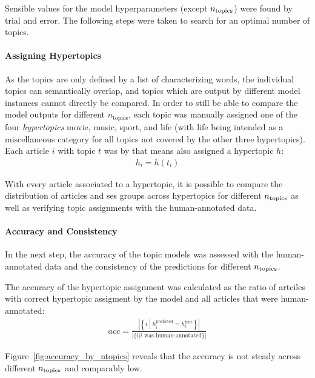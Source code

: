 Sensible values for the model hyperparameters (except $n_\text{topics}$) were found by trial and error. The following steps were taken to search for an optimal number of topics.

\paragraph{Assigning Hypertopics}
As the topics are only defined by a list of characterizing words, the individual topics can semantically overlap, and topics which are output by different model instances cannot directly be compared. In order to still be able to compare the model outputs for different $n_\text{topics}$, each topic was manually assigned one of the four \textit{hypertopics} movie, music, sport, and life (with life being intended as a miscellaneous category for all topics not covered by the other three hypertopics). Each article $i$ with topic $t$ was by that means also assigned a hypertopic $h$:
\begin{align}
    h_i = h(t_i)
\end{align}

With every article associated to a hypertopic, it is possible to compare the distribution of articles and \gls{ses} groups across hypertopics for different $n_\text{topics}$ as well as verifying topic assignments with the human-annotated data.

\paragraph{Accuracy and Consistency}
In the next step, the accuracy of the topic models was assessed with the human-annotated data and the consistency of the predictions for different $n_\text{topics}$.

The accuracy of the hypertopic assignment was calculated as the ratio of artciles with correct hypertopic assigment by the model and all articles that were human-annotated:
\begin{align}
    acc = \frac{
        \left|
            \left\{i\middle|h_{i}^\text{predicted} = h_{i}^\text{true}\right\}
        \right|
    }{
        \left|
            \{{i|i \text{ was human-annotated}}\}
        \right|
    }
\end{align}

Figure~\ref{fig:accuracy_by_ntopics} reveals that the accuracy is not steady across different $n_\text{topics}$ and comparably low.

